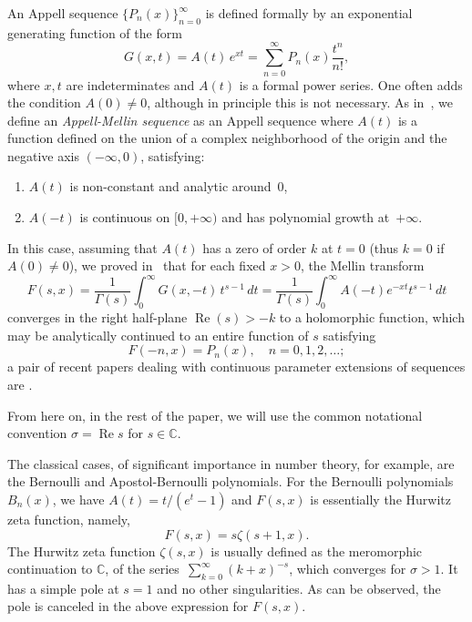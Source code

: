 \documentclass[11pt,a4paper]{amsart}
\newcommand{\C}{\mathbb{C}}
\renewcommand{\Re}{\operatorname{Re}}
\theoremstyle{plain}
\theoremstyle{plain}
\theoremstyle{plain}
\theoremstyle{remark}
\begin{document}
An Appell sequence $\{P_{n}(x)\}_{n=0}^{\infty}$ is defined formally by an exponential generating function of the form
\begin{equation}
\label{eq:Appell_def}
  G(x,t) = A(t) \, e^{xt} = \sum_{n=0}^\infty P_{n}(x)\frac{t^n}{n!},
\end{equation}
where $x,t$ are indeterminates and $A(t)$ is a formal power series. One often adds the condition $A(0) \neq 0$, although in principle this is not necessary. As in~\cite{NRV-values}, we define an \emph{Appell-Mellin sequence} as an Appell sequence where $A(t)$ is a function defined on the union of a complex neighborhood of the origin and the negative axis $(-\infty,0)$, satisfying:
\begin{enumerate}[label=\normalfont(\alph*)]
  \item $A(t)$ is non-constant and analytic around~$0$,
  \item $A(-t)$ is continuous on $[0,+\infty)$ and has polynomial growth at~$+\infty$.
\end{enumerate}

In this case, assuming that $A(t)$ has a zero of order $k$ at $t = 0$ (thus $k=0$ if $A(0) \ne 0$), we proved in~\cite{NRV-values} that for each fixed $x>0$, the Mellin transform
\begin{equation}
\label{eq:Mellin_GF_def}
    F(s,x) = \frac{1}{\Gamma(s)}\int_{0}^{\infty} G(x,-t)\,t^{s-1}\,dt
         = \frac{1}{\Gamma(s)} \int_{0}^{\infty} A(-t) e^{-xt} t^{s-1}\,dt
\end{equation}
converges in the right half-plane $\Re(s) > -k$  to a holomorphic function, which may be  analytically continued to an entire function of $s$ satisfying
\begin{equation}
\label{eq:sinCeros}
  F(-n,x)=P_{n}(x),\quad n=0,1,2,\dots;
\end{equation}
a pair of recent papers dealing with continuous parameter extensions of sequences are \cite{CGale-I, CGale-II}.

From here on, in the rest of the paper, we will use the common notational convention $\sigma = \Re s$ for $s \in \C$.

The classical cases, of significant importance in number theory, for example, are the Bernoulli and Apostol-Bernoulli polynomials. For the Bernoulli polynomials $B_n(x)$, we have $A(t)=t/(e^t-1)$ and $F(s,x)$ is essentially the Hurwitz zeta function, namely,
\begin{equation}
\label{eq:Mellin-Hurwitz}
  F(s,x) = s \zeta(s+1,x).
\end{equation}
The Hurwitz zeta function $\zeta(s,x)$ is usually defined as the meromorphic continuation to $\C$, of the series~$\sum_{k=0}^{\infty} (k + x)^{-s}$, which converges for $\sigma > 1$. It has a simple pole at $s=1$ and no other singularities. As can be observed, the pole is canceled in the above expression for $F(s,x)$.
\end{document}
